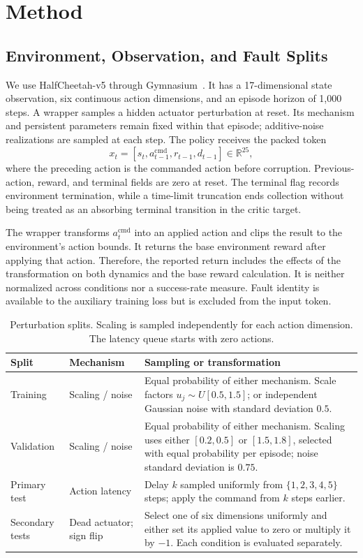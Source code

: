 \documentclass[runningheads]{llncs}
\begin{document}
\section{Method}
\subsection{Environment, Observation, and Fault Splits}
We use HalfCheetah-v5 through Gymnasium~\cite{gym}. It has a 17-dimensional state observation, six continuous action dimensions, and an episode horizon of 1,000 steps. A wrapper samples a hidden actuator perturbation at reset. Its mechanism and persistent parameters remain fixed within that episode; additive-noise realizations are sampled at each step. The policy receives the packed token
\begin{equation}
 x_t = [s_t, a_{t-1}^{\mathrm{cmd}}, r_{t-1}, d_{t-1}] \in \mathbb{R}^{25},
 \label{eq:token}
\end{equation}
where the preceding action is the commanded action before corruption. Previous-action, reward, and terminal fields are zero at reset. The terminal flag records environment termination, while a time-limit truncation ends collection without being treated as an absorbing terminal transition in the critic target.

The wrapper transforms $a_t^{\mathrm{cmd}}$ into an applied action and clips the result to the environment's action bounds. It returns the base environment reward after applying that action. Therefore, the reported return includes the effects of the transformation on both dynamics and the base reward calculation. It is neither normalized across conditions nor a success-rate measure. Fault identity is available to the auxiliary training loss but is excluded from the input token.

\begin{table}[t]
\caption{Perturbation splits. Scaling is sampled independently for each action dimension. The latency queue starts with zero actions.}
\label{tab:faults}
\centering\small
\begin{tabular}{@{}p{}p{}p{}@{}}
\toprule
Split & Mechanism & Sampling or transformation \\
\midrule
Training & Scaling / noise & Equal probability of either mechanism. Scale factors $u_j\sim U[0.5,1.5]$; or independent Gaussian noise with standard deviation $0.5$. \\
Validation & Scaling / noise & Equal probability of either mechanism. Scaling uses either $[0.2,0.5]$ or $[1.5,1.8]$, selected with equal probability per episode; noise standard deviation is $0.75$. \\
Primary test & Action latency & Delay $k$ sampled uniformly from $\{1,2,3,4,5\}$ steps; apply the command from $k$ steps earlier. \\
Secondary tests & Dead actuator; sign flip & Select one of six dimensions uniformly and either set its applied value to zero or multiply it by $-1$. Each condition is evaluated separately. \\
\bottomrule
\end{tabular}
\end{table}
\end{document}
